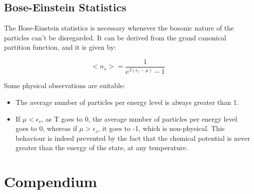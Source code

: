 \documentclass{article}
\begin{document}
\subsection{Bose-Einstein Statistics}

The Bose-Einstein statistics is necessary whenever the bosonic nature of the particles
can't be disregarded.
It can be derived from the grand canonical partition function, and it is given by:

\begin{equation}
    <n_s>=\frac{1}{e^{\beta(\epsilon_s-\mu)}-1}
\end{equation}

Some physical observations are suitable:

\begin{itemize}
    \item The average number of particles per energy level is always greater than 1.
    \item If $\mu<\epsilon_s$, as T goes to 0, the average number of particles per energy level goes to 0,
          whereas if $\mu>\epsilon_s$, it goes to -1, which is non-physical. This behaviour is indeed prevented by
          the fact that the chemical potential is never greater than the energy of the state, at any temperature.
\end{itemize}

\newpage
\section{Compendium}


\end{document}
